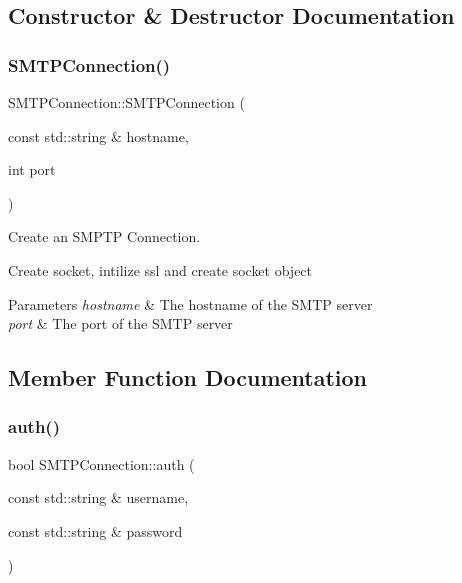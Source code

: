 \subsection{Constructor \& Destructor Documentation}
\mbox{\label{classSMTPConnection_a3f3d0375660759191abae144bfeac15a}} 
\subsubsection{\texorpdfstring{S\+M\+T\+P\+Connection()}{SMTPConnection()}}
{\footnotesize\ttfamily S\+M\+T\+P\+Connection\+::\+S\+M\+T\+P\+Connection (\begin{DoxyParamCaption}\item[{const std\+::string \&}]{hostname,  }\item[{int}]{port }\end{DoxyParamCaption})}



Create an S\+M\+P\+TP Connection. 

Create socket, intilize ssl and create socket object


\begin{DoxyParams}{Parameters}
{\em hostname} & The hostname of the S\+M\+TP server \\
\hline
{\em port} & The port of the S\+M\+TP server \\
\hline
\end{DoxyParams}


\subsection{Member Function Documentation}
\mbox{\label{classSMTPConnection_a11fabb5c55b1a68df712bfa34f6524f5}} 
\subsubsection{\texorpdfstring{auth()}{auth()}}
{\footnotesize\ttfamily bool S\+M\+T\+P\+Connection\+::auth (\begin{DoxyParamCaption}\item[{const std\+::string \&}]{username,  }\item[{const std\+::string \&}]{password }\end{DoxyParamCaption})}



